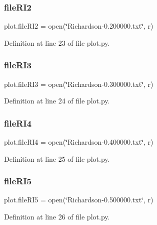 \mbox{\label{namespaceplot_a1ce30d89809f3a7ae1b94d902f0d2e3a}} 
\subsubsection{file\+R\+I2}
{\footnotesize\ttfamily plot.\+file\+R\+I2 = open(\char`\"{}Richardson-\/0.\+200000.txt\char`\"{}, \textquotesingle{}r\textquotesingle{})}



Definition at line 23 of file plot.\+py.

\mbox{\label{namespaceplot_a72f3b281a218b5ab95f96ed610d6b521}} 
\subsubsection{file\+R\+I3}
{\footnotesize\ttfamily plot.\+file\+R\+I3 = open(\char`\"{}Richardson-\/0.\+300000.txt\char`\"{}, \textquotesingle{}r\textquotesingle{})}



Definition at line 24 of file plot.\+py.

\mbox{\label{namespaceplot_a046b08e584363859afd05b0bffc4b825}} 
\subsubsection{file\+R\+I4}
{\footnotesize\ttfamily plot.\+file\+R\+I4 = open(\char`\"{}Richardson-\/0.\+400000.txt\char`\"{}, \textquotesingle{}r\textquotesingle{})}



Definition at line 25 of file plot.\+py.

\mbox{\label{namespaceplot_aa00c759a249a85ac4b8595724d6051a2}} 
\subsubsection{file\+R\+I5}
{\footnotesize\ttfamily plot.\+file\+R\+I5 = open(\char`\"{}Richardson-\/0.\+500000.txt\char`\"{}, \textquotesingle{}r\textquotesingle{})}



Definition at line 26 of file plot.\+py.

\mbox{\label{namespaceplot_acd586d80b4b6f7d7a056ed2d61e65dc7}} 
